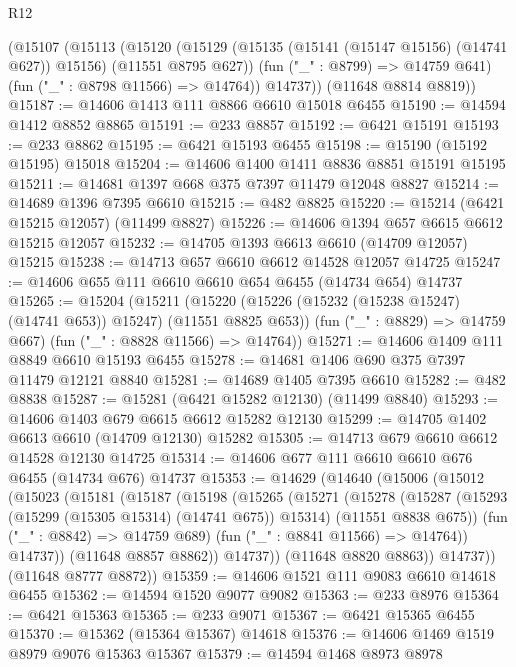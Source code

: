 \begin{lexlean}{R12}
\begin{coremodule}
      (@15107
        (@15113
          (@15120
            (@15129 (@15135 (@15141 (@15147 @15156) (@14741 @627)) @15156) (@11551 @8795 @627))
            (fun ("_" : @8799) => @14759 @641)
            (fun ("_" : @8798 @11566) => @14764))
          @14737))
      (@11648 @8814 @8819))
@15187 := @14606 @1413 @111 @8866 @6610 @15018 @6455
@15190 := @14594 @1412 @8852 @8865
@15191 := @233 @8857
@15192 := @6421 @15191
@15193 := @233 @8862
@15195 := @6421 @15193 @6455
@15198 := @15190 (@15192 @15195) @15018
@15204 := @14606 @1400 @1411 @8836 @8851 @15191 @15195
@15211 := @14681 @1397 @668 @375 @7397 @11479 @12048 @8827
@15214 := @14689 @1396 @7395 @6610
@15215 := @482 @8825
@15220 := @15214 (@6421 @15215 @12057) (@11499 @8827)
@15226 := @14606 @1394 @657 @6615 @6612 @15215 @12057
@15232 := @14705 @1393 @6613 @6610 (@14709 @12057) @15215
@15238 := @14713 @657 @6610 @6612 @14528 @12057 @14725
@15247 := @14606 @655 @111 @6610 @6610 @654 @6455 (@14734 @654) @14737
@15265 := @15204
    (@15211
      (@15220 (@15226 (@15232 (@15238 @15247) (@14741 @653)) @15247) (@11551 @8825 @653))
      (fun ("_" : @8829) => @14759 @667)
      (fun ("_" : @8828 @11566) => @14764))
@15271 := @14606 @1409 @111 @8849 @6610 @15193 @6455
@15278 := @14681 @1406 @690 @375 @7397 @11479 @12121 @8840
@15281 := @14689 @1405 @7395 @6610
@15282 := @482 @8838
@15287 := @15281 (@6421 @15282 @12130) (@11499 @8840)
@15293 := @14606 @1403 @679 @6615 @6612 @15282 @12130
@15299 := @14705 @1402 @6613 @6610 (@14709 @12130) @15282
@15305 := @14713 @679 @6610 @6612 @14528 @12130 @14725
@15314 := @14606 @677 @111 @6610 @6610 @676 @6455 (@14734 @676) @14737
@15353 := @14629
    (@14640
      (@15006
        (@15012
          (@15023
            (@15181
              (@15187
                (@15198
                  (@15265
                    (@15271
                      (@15278
                        (@15287
                          (@15293 (@15299 (@15305 @15314) (@14741 @675)) @15314)
                          (@11551 @8838 @675))
                        (fun ("_" : @8842) => @14759 @689)
                        (fun ("_" : @8841 @11566) => @14764))
                      @14737))
                  (@11648 @8857 @8862))
                @14737))
            (@11648 @8820 @8863))
          @14737))
      (@11648 @8777 @8872))
@15359 := @14606 @1521 @111 @9083 @6610 @14618 @6455
@15362 := @14594 @1520 @9077 @9082
@15363 := @233 @8976
@15364 := @6421 @15363
@15365 := @233 @9071
@15367 := @6421 @15365 @6455
@15370 := @15362 (@15364 @15367) @14618
@15376 := @14606 @1469 @1519 @8979 @9076 @15363 @15367
@15379 := @14594 @1468 @8973 @8978

\end{coremodule}
\end{lexlean}
